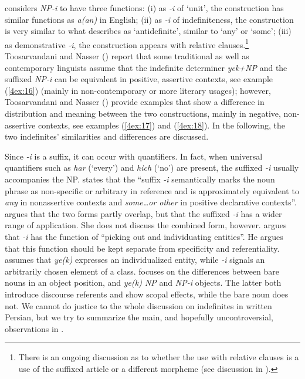 \documentclass[output=paper]{langsci/langscibook}
\begin{document}
\cite{windfuhr:79} considers {\emph{NP-i}} to have three functions: (i) as {\emph{-i}} of `unit', the construction has similar functions as {\emph{a(an)}} in English; (ii) as {\emph{-i}} of indefiniteness, the construction is very similar to what \cite{jasbi:16} describes as `antidefinite', similar to `any' or `some'; (iii) as demonstrative {\emph{-i}}, the construction appears with relative clauses.\footnote{There is an ongoing discussion as to whether the use with relative clauses is a use of the suffixed article or a different morpheme (see discussion in \citealt[][65]{ghomeshi:03}).} Toosarvandani and Nasser (\citeyear{toosarvandani:nasser:17}) report that some traditional \citep{lambton:53} as well as contemporary linguists \citep{ghomeshi:03} assume that the indefinite determiner {\emph{yek+NP}} and the suffixed {\emph{NP-i}} can be equivalent in positive, assertive contexts, see example (\ref{4ex:16}) (mainly in non-contemporary or more literary usages); however, Toosarvandani and Nasser (\citeyear{toosarvandani:nasser:17}) provide examples that show a difference in distribution and meaning between the two constructions, mainly in negative, non-assertive contexts, see examples (\ref{4ex:17}) and (\ref{4ex:18}). In the following, the two indefinites' similarities and differences are discussed.

{
Since {\emph{-i}} is a suffix, it can occur with quantifiers. In fact, when universal quantifiers such as {\emph{har}} (`every') and {\emph{hich}} (`no') are present, the suffixed {\emph{-i}} usually accompanies the NP. \cite[][90]{lyons:99} states that the ``suffix {\emph{-i}} semantically marks the noun phrase as non-specific or arbitrary in reference and is approximately equivalent to {\emph{any}} in nonassertive contexts and {\emph{some…or other}} in positive declarative contexts''. \cite[][64-65]{ghomeshi:03} argues that the two forms partly overlap, but that the suffixed {\emph{-i}} has a wider range of application. She does not discuss the combined form, however. \cite[][325]{paul:08} argues that {\emph{-i}} has the function of ``picking out and individuating entities''. He argues that this function should be kept separate from specificity and referentiality. \cite[][169-170]{hincha:61} assumes that {\emph{ye(k)}} expresses an individualized entity, while {\emph{-i}} signals an arbitrarily chosen element of a class. \cite[][16-19]{modarresi:14} focuses on the differences between bare nouns in an object position, and {\emph{ye(k) NP}} and {\emph{NP-i}} objects. The latter both introduce discourse referents and show scopal effects, while the bare noun does not. We cannot do justice to the whole discussion on indefinites in written Persian, but we try to summarize the main, and hopefully uncontroversial, observations in .
}
\end{document}
